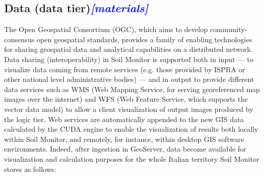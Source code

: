 \documentclass[APA,LATO1COL,doublespace]{WileyNJD-v2}
\newcommand{\update}[1]{\emph{\textcolor{blue}{#1}}}     %
\begin{document}
\subsection{Data (data tier)\update{[materials]}}\label{sec:dataTier}
The Open Geospatial Consortium (OGC), which aims to develop community-consensus open geospatial standards, provides a family of enabling technologies for sharing geospatial data and analytical capabilities on a distributed network. 
Data sharing (interoperability) in Soil Monitor is supported both in input --- to visualize data coming from remote services (e.g. those provided by ISPRA or other national level administrative bodies) --- and in output to provide different data services such as WMS (Web Mapping Service, for serving georeferenced map images over the internet) and WFS (Web Feature Service, which supports the vector data model) to allow a client visualization of output images produced by the logic tier.
Web services are automatically appended to the new GIS data calculated by the CUDA engine to enable the visualization of results both locally within Soil Monitor, and remotely, for instance, within desktop GIS software environments.
Indeed, after ingestion in GeoServer, data become available for visualization and calculation purposes for the whole Italian territory Soil Monitor stores as follows:
\end{document}
